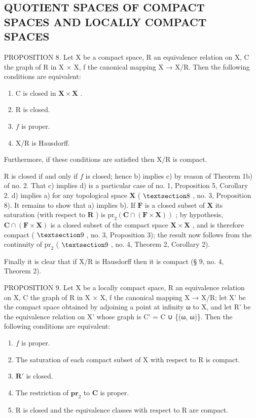 \subsection{QUOTIENT SPACES OF COMPACT SPACES AND LOCALLY COMPACT SPACES}

PROPOSITION 8. Let X be a compact space, R an equivalence relation on X, C the graph of R in X × X, f the canonical mapping X → X/R. Then the following conditions are equivalent:

\begin{enumerate}
\def\labelenumi{\alph{enumi})}
\item
  C is closed in \(\mathbf{X} \times \mathbf{X}\) .
\item
  R is closed.
\item
  \(f\) is proper.
\item
  X/R is Hausdorff.
\end{enumerate}

Furthermore, if these conditions are satisfied then X/R is compact.

R is closed if and only if \(f\) is closed; hence b) implies c) by reason of Theorem 1b) of no. 2. That c) implies d) is a particular case of no. 1, Proposition 5, Corollary 2. d) implies a) for any topological space \(\mathbf{X}\) ( \(\S 8\) , no. 3, Proposition 8). It remains to show that a) implies b). If \(\mathbf{F}\) is a closed subset of \(\mathbf{X}\) its saturation (with respect to \(\mathbf{R}\) ) is \(\mathrm{pr}_2(\mathbf{C} \cap (\mathbf{F} \times \mathbf{X}))\) ; by hypothesis, \(\mathbf{C} \cap (\mathbf{F} \times \mathbf{X})\) is a closed subset of the compact space \(\mathbf{X} \times \mathbf{X}\) , and is therefore compact ( \(\S 9\) , no. 3, Proposition 3); the result now follows from the continuity of \(\mathrm{pr}_2\) ( \(\S 9\) , no. 4, Theorem 2, Corollary 2).

Finally it is clear that if X/R is Hausdorff then it is compact (§ 9, no. 4, Theorem 2).

PROPOSITION 9. Let X be a locally compact space, R an equivalence relation on X, C the graph of R in X × X, f the canonical mapping X → X/R; let X' be the compact space obtained by adjoining a point at infinity ω to X, and let R' be the equivalence relation on X' whose graph is C' = C ∪ \{(ω, ω)\}. Then the following conditions are equivalent:

\begin{enumerate}
\def\labelenumi{\alph{enumi})}
\item
  \(f\) is proper.
\item
  The saturation of each compact subset of X with respect to R is compact.
\item
  \(\mathbf{R}'\) is closed.
\item
  The restriction of \(\mathbf{pr}_2\) to \(\mathbf{C}\) is proper.
\item
  R is closed and the equivalence classes with respect to R are compact.
\end{enumerate}

